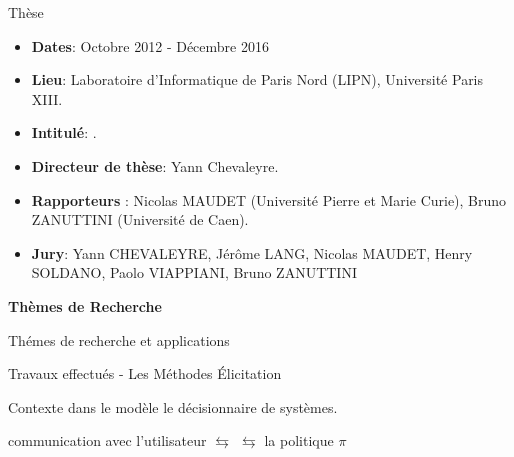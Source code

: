 \documentclass{beamer}
\newcommand{\imp}[1]{{\color{red}{#1}}}
\begin{document}
{\begin{frame}{Thèse}
\begin{itemize} 
\item \textbf{Dates}: Octobre 2012 - Décembre 2016
\item \textbf{Lieu}: Laboratoire d’Informatique de Paris Nord (LIPN),
Université Paris XIII.
\item \textbf{Intitulé}: \imp{Élicitation et planification dans les processus de
décision de Markov avec des récompenses inconnues}.
\item \textbf{Directeur de thèse}: Yann Chevaleyre.
\item \textbf{Rapporteurs} : Nicolas MAUDET (Université Pierre et
Marie Curie), Bruno ZANUTTINI (Université de Caen).
\item \textbf{Jury}: Yann CHEVALEYRE, Jérôme LANG, Nicolas
MAUDET, Henry SOLDANO, Paolo VIAPPIANI, Bruno
ZANUTTINI
\end{itemize}
	
\end{frame}

\begin{frame}
	\begin{center}
	\textbf{Thèmes de Recherche}
	\end{center}
\end{frame}
{


\begin{frame}{Thémes de recherche et applications}

\end{frame}

\begin{frame}{Travaux effectués - Les Méthodes Élicitation}
\begin{block}{Contexte}
\imp{Prédire des informations incertains} dans le modèle \imp{en interrogeant} le décisionnaire de systèmes.
\begin{center}
communication avec l’utilisateur $\leftrightarrows$  $\leftrightarrows$ la politique $\pi$
\end{center}
\end{block}



\end{frame}}}
\end{document}
